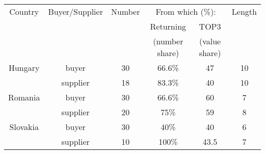
\begin{tabular}{cccccc}
\hline
    Country & Buyer/Supplier & Number & \multicolumn{2}{c}{From which (\%):} & Length \\
     & & & Returning & TOP3 & \\
     &&&(number share) & (value share) & \\
     \hline
     Hungary  & buyer & 30 & 66.6\% & 47 &10 \\
              & supplier & 18 & 83.3\% & 40 &10 \\ 
     Romania  & buyer & 30 & 66.6\% & 60 &7 \\
              & supplier & 20 & 75\% & 59 &8 \\
     Slovakia & buyer & 30 & 40\% & 40 &6 \\
              & supplier & 10 & 100\% & 43.5 &7 \\ \hline
\end{tabular}
